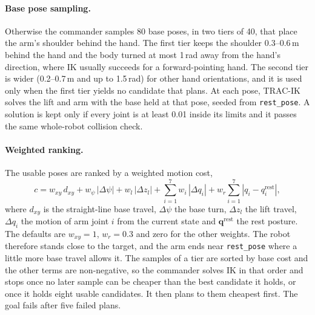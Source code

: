 \documentclass[12pt,a4paper]{article}
\begin{document}
\paragraph{Base pose sampling.}
Otherwise the commander samples 80 base poses, in two tiers of 40, that place the arm's shoulder behind
the hand. The first tier keeps the shoulder 0.3--0.6\,m behind the hand and the body turned at most
1\,rad away from the hand's direction, where IK usually succeeds for a forward-pointing hand. The second
tier is wider (0.2--0.7\,m and up to 1.5\,rad) for other hand orientations, and it is used only when the
first tier yields no candidate that plans. At each pose, TRAC-IK solves the lift and arm with the base
held at that pose, seeded from \texttt{rest\_pose}. A solution is kept only if every joint is at least
0.01 inside its limits and it passes the same whole-robot collision check.

\paragraph{Weighted ranking.}
The usable poses are ranked by a weighted motion cost,
\begin{equation}
    c = w_{xy}\,d_{xy} + w_{\psi}\,|\Delta\psi| + w_{l}\,|\Delta z_l|
        + \sum_{i=1}^{7} w_i\,|\Delta q_i| + w_{r}\sum_{i=1}^{7}\left|q_i-q_i^{\mathrm{rest}}\right|,
    \label{eq:wb_cost}
\end{equation}
where $d_{xy}$ is the straight-line base travel, $\Delta\psi$ the base turn, $\Delta z_l$ the lift
travel, $\Delta q_i$ the motion of arm joint $i$ from the current state and $\mathbf{q}^{\mathrm{rest}}$
the rest posture. The defaults are $w_{xy}=1$, $w_r=0.3$ and zero for the other weights. The robot
therefore stands close to the target, and the arm ends near \texttt{rest\_pose} where a little more base
travel allows it. The samples of a tier are sorted by base cost and the other terms are non-negative, so
the commander solves IK in that order and stops once no later sample can be cheaper than the best
candidate it holds, or once it holds eight usable candidates. It then plans to them cheapest first. The
goal fails after five failed plans.
\end{document}
